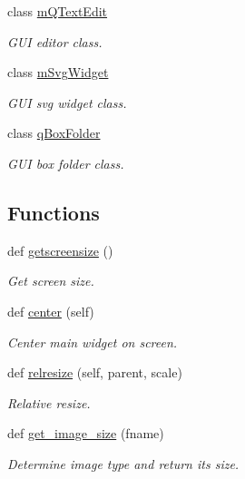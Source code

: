 \begin{DoxyCompactItemize}
class \hyperlink{classmolSimplify_1_1Classes_1_1mWidgets_1_1mQTextEdit}{m\+Q\+Text\+Edit}
\begin{DoxyCompactList}\small\item\em G\+UI editor class. \end{DoxyCompactList}\item 
class \hyperlink{classmolSimplify_1_1Classes_1_1mWidgets_1_1mSvgWidget}{m\+Svg\+Widget}
\begin{DoxyCompactList}\small\item\em G\+UI svg widget class. \end{DoxyCompactList}\item 
class \hyperlink{classmolSimplify_1_1Classes_1_1mWidgets_1_1qBoxFolder}{q\+Box\+Folder}
\begin{DoxyCompactList}\small\item\em G\+UI box folder class. \end{DoxyCompactList}\end{DoxyCompactItemize}
\subsection*{Functions}
\begin{DoxyCompactItemize}
\item 
def \hyperlink{namespacemolSimplify_1_1Classes_1_1mWidgets_a1dff0322b0b9d5a64f409cc79f265cf8}{getscreensize} ()
\begin{DoxyCompactList}\small\item\em Get screen size. \end{DoxyCompactList}\item 
def \hyperlink{namespacemolSimplify_1_1Classes_1_1mWidgets_a02a4d30611992ba00edc906b44c2e77b}{center} (self)
\begin{DoxyCompactList}\small\item\em Center main widget on screen. \end{DoxyCompactList}\item 
def \hyperlink{namespacemolSimplify_1_1Classes_1_1mWidgets_a0c667e8ee9701b4fd0da324bbe4b0c7f}{relresize} (self, parent, scale)
\begin{DoxyCompactList}\small\item\em Relative resize. \end{DoxyCompactList}\item 
def \hyperlink{namespacemolSimplify_1_1Classes_1_1mWidgets_a31afbc5c9cfaffcbf75a388f50b0e5c3}{get\+\_\+image\+\_\+size} (fname)
\begin{DoxyCompactList}\small\item\em Determine image type and return its size. \end{DoxyCompactList}\end{DoxyCompactItemize}


